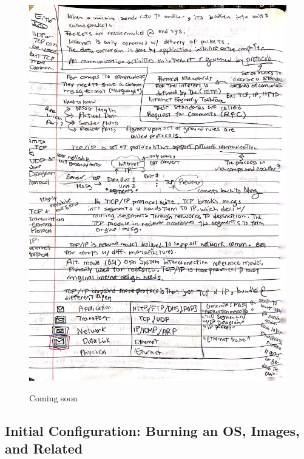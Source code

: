 \documentclass[a4paper, 10pt]{article}
\begin{document}
            \begin{figure}[htbp]
            \centering
            \includegraphics[width=1.2\textwidth]{media/temp_tcpip_notes.jpg}
            \label{fig:TCP/IP Notes placeholder}
            \caption{Coming soon}
            \end{figure}

        
    \subsection{Initial Configuration: Burning an OS, Images, and Related}  
\end{document}
